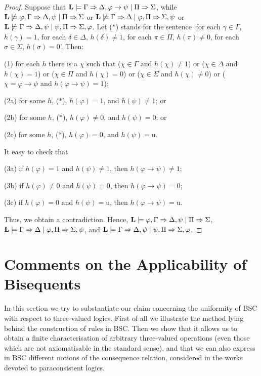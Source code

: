 \documentclass[10pt,a4paper]{article}
\theoremstyle{definition}
\newcommand{\3}{\vspace{.3in}}
\newcommand{\2}{\vspace{.2in}}
\newcommand{\1}{\vspace{.1in}}
\newcommand{\5}{\vspace{.05in}}
\begin{document}
\begin{proof}
Suppose that $ {\bf L}\models \Gamma\Rightarrow\Delta,\varphi\rightarrow\psi\mid\Pi\Rightarrow\Sigma$, while $ {\bf L}\not\models \varphi,\Gamma\Rightarrow\Delta,\psi\mid\Pi\Rightarrow\Sigma$ or $ {\bf L}\not\models \Gamma\Rightarrow\Delta\mid\varphi,\Pi\Rightarrow\Sigma,\psi$ or $ {\bf L}\not\models \Gamma\Rightarrow\Delta,\psi\mid\psi,\Pi\Rightarrow\Sigma,\varphi$. Let ($ \ast $) stands for the sentence `for each $ \gamma\in\Gamma $, $h(\gamma)=1$, for each $ \delta\in\Delta $, $ h(\delta)\not=1 $, for each $ \pi\in\Pi $, $ h(\pi)\not=0 $, for each $ \sigma\in\Sigma $, $ h(\sigma)=0 $'. Then:

(1) for each $ h $ there is a $ \chi $ such that ($ \chi\in\Gamma $ and $ h(\chi)\not=1 $) or ($ \chi\in\Delta $ and $ h(\chi)=1 $) or ($ \chi\in\Pi $ and $ h(\chi)=0$) or ($ \chi\in\Sigma $ and $ h(\chi)\not=0 $) or ($ \chi=\varphi\rightarrow\psi $ and $ h(\varphi\rightarrow\psi)=1 $);

(2a) for some $ h $, ($ \ast $), $ h(\varphi)=1$, and $ h(\psi)\not=1$; or 

(2b) for some $ h $, ($ \ast $), $ h(\varphi)\not=0$, and $ h(\psi)=0$; or 

(2c) for some $ h $, ($ \ast $), $ h(\varphi)=0$, and $ h(\psi)=\mathrm{u}$.

It easy to check that

(3a) if $ h(\varphi)=1$ and $ h(\psi)\not=1$, then $ h(\varphi\rightarrow\psi)\not=1 $;

(3b) if $ h(\varphi)\not=0$ and $ h(\psi)=0$, then $ h(\varphi\rightarrow\psi)=0$;

(3c) if $ h(\varphi)=0$ and $ h(\psi)=\mathrm{u}$, then $ h(\varphi\rightarrow\psi)=\mathrm{u}$.

Thus, we obtain a contradiction. Hence, $ {\bf L}\models \varphi,\Gamma\Rightarrow\Delta,\psi\mid\Pi\Rightarrow\Sigma$, $ {\bf L}\models \Gamma\Rightarrow\Delta\mid\varphi,\Pi\Rightarrow\Sigma,\psi$, and $ {\bf L}\models \Gamma\Rightarrow\Delta,\psi\mid\psi,\Pi\Rightarrow\Sigma,\varphi$. 
\end{proof}


\section{Comments on the Applicability of Bisequents}\label{Comments}

In this section we try to substantiate our claim concerning the uniformity of BSC with respect to three-valued logics. First of all we illustrate the method lying behind the construction of rules in BSC. Then we show that it allows us to obtain a finite characterisation of arbitrary three-valued operations (even those which are not axiomatisable in the standard sense), and that we can also express in BSC different notions of the consequence relation, considered in the works devoted to paraconsistent logics.
\end{document}
